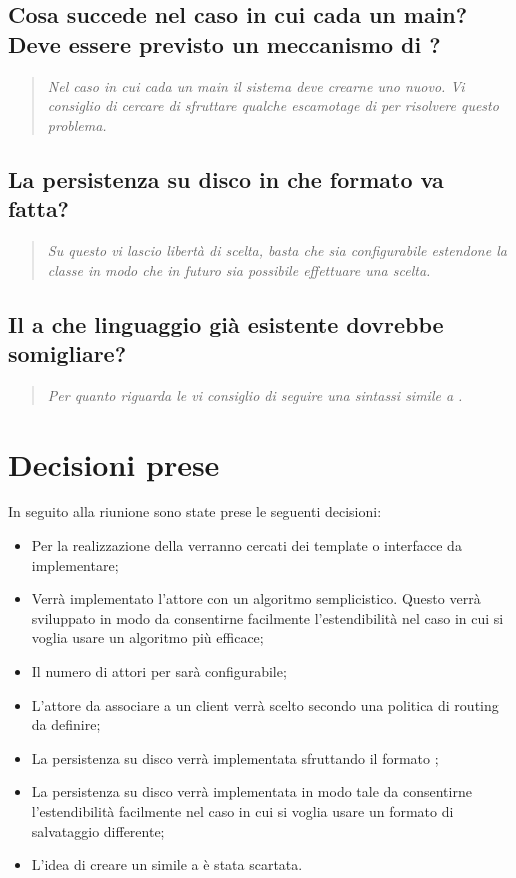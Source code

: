 \documentclass{scalatekids-article}
\begin{document}
\subsection{Cosa succede nel caso in cui cada un main? Deve essere previsto un meccanismo di ?}
\begin{quote}
  \textit{Nel caso in cui cada un main il sistema deve crearne uno nuovo. Vi consiglio di cercare di sfruttare qualche escamotage di  per risolvere questo problema.\\}
\end{quote}
\subsection{La persistenza su disco in che formato va fatta?}
\begin{quote}
  \textit{Su questo vi lascio libertà di scelta, basta che sia configurabile estendone la classe in modo che in futuro sia possibile effettuare una scelta.\\}
\end{quote}
\subsection{Il  a che linguaggio già esistente dovrebbe somigliare?}
\begin{quote}
  \textit{Per quanto riguarda le  vi consiglio di seguire una sintassi simile a .\\}
\end{quote}
\section{Decisioni prese}
In seguito alla riunione sono state prese le seguenti decisioni:
\begin{itemize}
\item Per la realizzazione della  verranno cercati dei template o interfacce da implementare;
\item Verrà implementato l'attore  con un algoritmo semplicistico. Questo verrà sviluppato in modo da consentirne facilmente l'estendibilità nel caso in cui si voglia usare un algoritmo più efficace;
\item Il numero di attori  per  sarà configurabile;
\item L'attore  da associare a un client verrà scelto secondo una politica di routing da definire;
\item La persistenza su disco verrà implementata sfruttando il formato ;
\item La persistenza su disco verrà implementata in modo tale da consentirne l'estendibilità facilmente nel caso in cui si voglia usare un formato di salvataggio differente;
\item L'idea di creare un  simile a  è stata scartata.
\end{itemize}
\end{document}
